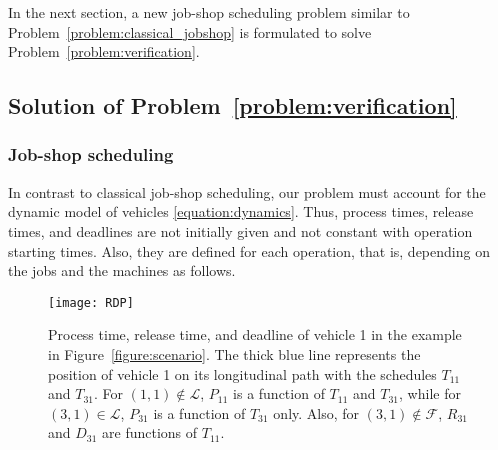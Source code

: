 \documentclass{sig-alternate}
\begin{document}
In the next section, a new job-shop scheduling problem similar to Problem~\ref{problem:classical_jobshop} is formulated to solve Problem~\ref{problem:verification}. 


\subsection{Solution of Problem~\ref{problem:verification}}\label{section:verification_solution}


\subsubsection{Job-shop scheduling}\label{section:job-shop}
 In contrast to classical job-shop scheduling, our problem must account for the dynamic model of vehicles \eqref{equation:dynamics}. Thus, process times, release times, and deadlines are not initially given and not constant with operation starting times. Also, they are defined for each operation, that is, depending on the jobs and the machines as follows.

	\begin{figure}[tb!]
	\centering
	\texttt{[image: RDP]}
	\caption{Process time, release time, and deadline of vehicle 1 in the example in Figure~\ref{figure:scenario}. The thick blue line represents the position of vehicle 1 on its longitudinal path with the schedules $T_{11}$ and $T_{31}$. For $(1,1)\notin\mathcal{L}$, $P_{11}$ is a function of $T_{11}$ and $T_{31}$, while for $(3,1)\in\mathcal{L}$, $P_{31}$ is a function of $T_{31}$ only. Also, for $(3,1)\notin\mathcal{F}$, $R_{31}$ and $D_{31}$ are functions of $T_{11}$.}
	\label{figure:RDP}
	\end{figure}
	
\end{document}
